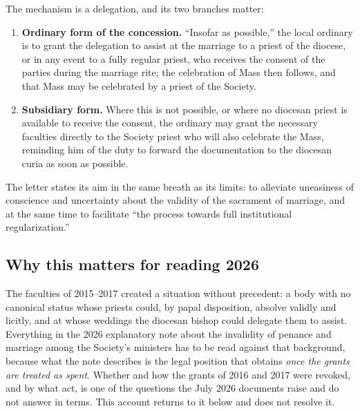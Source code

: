 The mechanism is a delegation, and its two branches matter:

\begin{enumerate}
\item \textbf{Ordinary form of the concession.} ``Insofar as possible,''
the local ordinary is to grant the delegation to assist at the marriage
to a priest of the diocese, or in any event to a fully regular priest,
who receives the consent of the parties during the marriage rite;
the celebration of Mass then follows, and that Mass may be celebrated by
a priest of the Society.
\item \textbf{Subsidiary form.} Where this is not possible, or where no
diocesan priest is available to receive the consent, the ordinary may
grant the necessary faculties directly to the Society priest who will
also celebrate the Mass, reminding him of the duty to forward the
documentation to the diocesan curia as soon as possible.
\end{enumerate}

The letter states its aim in the same breath as its limits: to alleviate
uneasiness of conscience and uncertainty about the validity of the
sacrament of marriage, and at the same time to facilitate ``the process
towards full institutional regularization.''


\subsection{Why this matters for reading 2026}

The faculties of 2015--2017 created a situation without precedent: a body
with no canonical status whose priests could, by papal disposition,
absolve validly and licitly, and at whose weddings the diocesan bishop
could delegate them to assist. Everything in the 2026 explanatory note
about the invalidity of penance and marriage among the Society's ministers
has to be read against that background, because what the note describes
is the legal position that obtains \emph{once the grants are treated as
spent}. Whether and how the grants of 2016 and 2017 were revoked, and by
what act, is one of the questions the July 2026 documents raise and do
not answer in terms. This account returns to it below and does not resolve
it.

